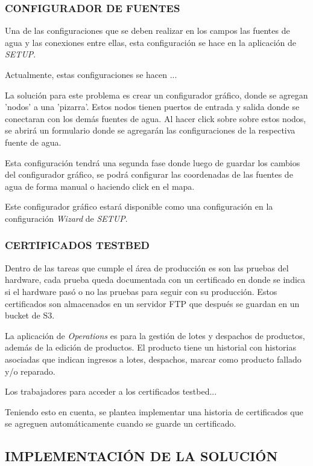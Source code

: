 \subsubsection{CONFIGURADOR DE FUENTES}

Una de las configuraciones que se deben realizar en los campos las fuentes de agua y las conexiones entre ellas, esta configuración se hace en la aplicación de \textit{SETUP}.

Actualmente, estas configuraciones se hacen ...

La solución para este problema es crear un configurador gráfico, donde se agregan 'nodos' a una 'pizarra'. Estos nodos tienen puertos de entrada y salida donde se conectaran con los demás fuentes de agua. Al hacer click sobre sobre estos nodos, se abrirá un formulario donde se agregarán las configuraciones de la respectiva fuente de agua.

Esta configuración tendrá una segunda fase donde luego de guardar los cambios del configurador gráfico, se podrá configurar las coordenadas de las fuentes de agua de forma manual o haciendo click en el mapa.

Este configurador gráfico estará disponible como una configuración en la configuración \textit{Wizard} de \textit{SETUP}.

\subsubsection{CERTIFICADOS TESTBED}

Dentro de las tareas que cumple el área de producción es son las pruebas del hardware, cada prueba queda documentada con
un certificado en donde se indica si el hardware pasó o no las pruebas para seguir con su producción. Estos certificados son
almacenados en un servidor FTP que después se guardan en un bucket de S3.

La aplicación de \textit{Operations} es para la gestión de lotes y despachos de productos, además de la edición de productos. 
El producto tiene un historial con historias asociadas que indican ingresos a lotes, despachos, marcar como producto fallado y/o reparado.

Los trabajadores para acceder a los certificados testbed...

Teniendo esto en cuenta, se plantea implementar una historia de certificados que se agreguen automáticamente cuando se guarde un
certificado.

\subsection{IMPLEMENTACIÓN DE LA SOLUCIÓN}

